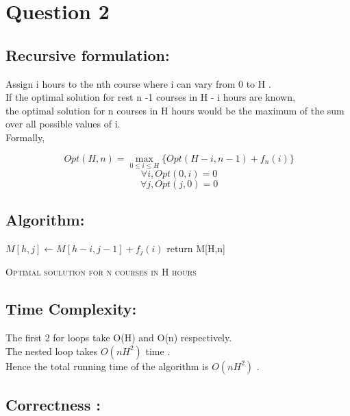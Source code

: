 \documentclass[11pt]{article}
\begin{document}
\section*{Question 2}

\subsection*{Recursive formulation:}

Assign i hours to the nth course where i can vary from 0 to H . \\

If the optimal solution for rest n -1 courses in H - i hours are known, \\

the optimal solution for n courses in H hours would be the maximum of the sum over all possible values of i. \\

Formally, 


\[
\ Opt(H,n) = \max_{0 \leq i \leq H} \{ Opt(H-i,n-1) + f_{n}(i) \} 
\]
\[
\  \forall i , Opt(0,i) = 0 
\]
\[
\  \forall j , Opt(j,0) = 0 
\]


\subsection*{Algorithm:}
\begin{algorithm}
 {
	 {
		 {
			 {
				$M[h,j] \leftarrow M[h-i,j-1] + f_j(i)$
				}
			}
	} 
}
return M[H,n]
\caption{\textsc{Optimal soulution for n courses in H hours}}
\label{UID}
\end{algorithm}

\subsection*{Time Complexity:}

The first 2 for loops take O(H) and  O(n) respectively. \\

The nested loop takes $O(nH^2)$ time . \\

Hence the total running time of the algorithm is $O(nH^2)$ . \\

\subsection*{Correctness :}
\end{document}
